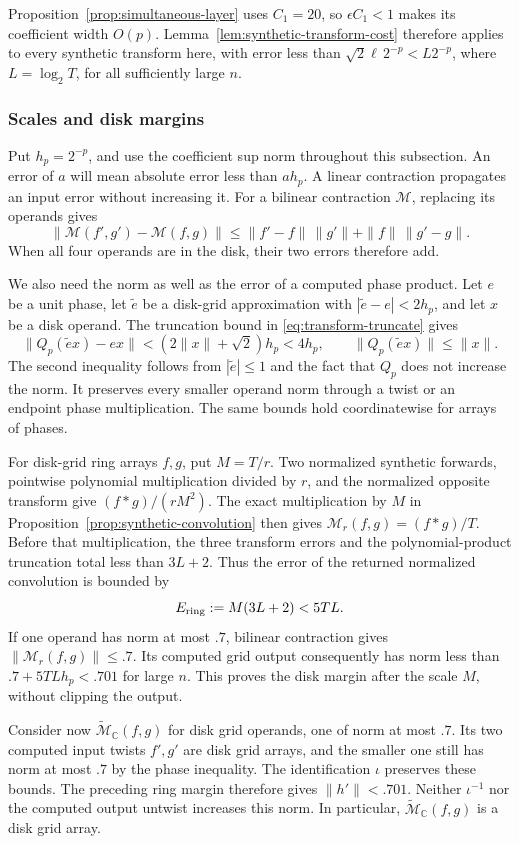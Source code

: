 \documentclass[11pt]{article}
\theoremstyle{definition}
\begin{document}
Proposition~\ref{prop:simultaneous-layer} uses
$C_1=20$, so $\epsilon C_1<1$ makes its coefficient width $O(p)$.
Lemma~\ref{lem:synthetic-transform-cost} therefore applies to every
synthetic transform here, with error less than
$\sqrt2\ell\,2^{-p}<L2^{-p}$, where $L=\log_2T$, for all
sufficiently large $n$.

\subsubsection{Scales and disk margins}

Put $h_p=2^{-p}$, and use the coefficient sup norm throughout this
subsection.  An error of $a$ will mean absolute error less than $ah_p$.
A linear contraction propagates an input error without increasing it.
For a bilinear contraction $\mathcal M$, replacing its operands gives
\[
 \|\mathcal M(f',g')-\mathcal M(f,g)\|
 \le \|f'-f\|\,\|g'\|+\|f\|\,\|g'-g\|.
\]
When all four operands are in the disk, their two errors therefore add.

We also need the norm as well as the error of a computed phase product.
Let $e$ be a unit phase, let $\widetilde e$ be a disk-grid approximation
with $|\widetilde e-e|<2h_p$, and let $x$ be a disk operand.  The
truncation bound in \eqref{eq:transform-truncate} gives
\[
 \|Q_p(\widetilde e x)-ex\|
   <(2\|x\|+\sqrt2)h_p<4h_p,
 \qquad
 \|Q_p(\widetilde e x)\|\le\|x\|.
\]
The second inequality follows from $|\widetilde e|\le1$ and the fact
that $Q_p$ does not increase the norm.  It preserves every smaller
operand norm through a twist or an endpoint phase multiplication.
The same bounds hold coordinatewise for arrays of phases.

For disk-grid ring arrays $f,g$, put $M=T/r$.  Two normalized synthetic
forwards, pointwise polynomial multiplication divided by $r$, and the
normalized opposite transform give $(f*g)/(rM^2)$.  The exact
multiplication by $M$ in Proposition~\ref{prop:synthetic-convolution}
then gives $\mathcal M_r(f,g)=(f*g)/T$.  Before that multiplication,
the three transform errors and the polynomial-product truncation total
less than $3L+2$.  Thus the error of the returned normalized
convolution is bounded by
\[
 E_{\rm ring}:=M(3L+2)<5TL.
\]
If one operand has norm at most $.7$, bilinear contraction gives
$\|\mathcal M_r(f,g)\|\le.7$.  Its computed grid output consequently
has norm less than $.7+5TLh_p<.701$ for large $n$.  This proves the
disk margin after the scale $M$, without clipping the output.

Consider now $\widetilde{\mathcal M}_{\mathbb C}(f,g)$ for disk grid
operands, one of norm at most $.7$.  Its two computed input twists
$f',g'$ are disk grid arrays, and the smaller one still has norm at
most $.7$ by the phase inequality.  The identification $\iota$
preserves these bounds.  The preceding ring margin therefore gives
$\|h'\|<.701$.  Neither $\iota^{-1}$ nor the computed output untwist
increases this norm.  In particular,
$\widetilde{\mathcal M}_{\mathbb C}(f,g)$ is a disk grid array.
\end{document}
